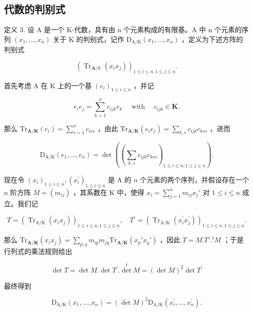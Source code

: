 \subsection{代数的判别式}

定义 3. 设 A 是一个 K-代数，具有由 n 个元素构成的有限基。A 中 n 个元素的序列 \((x_{1},\ldots,x_{n})\) 关于 K 的判别式，记作 \(\mathrm{D}_{\mathrm{A}/\mathrm{K}}(x_{1},\ldots,x_{n})\) ，定义为下述方阵的判别式

\[
\left(\operatorname{Tr} _ {\mathbf {A} / \mathbb {K}} \left(x _ {i} x _ {j}\right)\right) _ {1 \leqslant i \leqslant n, 1 \leqslant j \leqslant n}.
\]

首先考虑 A 在 K 上的一个基 \((e_i)_{1\leqslant i\leqslant n}\) ，并记

\[
e _ {i} e _ {j} = \sum_ {k = 1} ^ {n} c _ {i j k} e _ {k} \quad \text { with } \quad c _ {i j k} \in \mathbf {K}.\tag{30}
\]

那么 \(\mathrm{Tr}_{\mathbf{A} / \mathbf{K}}(e_i) = \sum_{s=1}^{n} c_{iss}\) ，由此 \(\mathrm{Tr}_{\mathbf{A} / \mathbf{K}}(e_i e_j) = \sum_{k,s} c_{ijk} c_{kss}\) ，进而

\[
\mathrm{D} _ {\mathrm{A} / \mathrm{K}} (e _ {1}, \dots , e _ {n}) = \det \left(\left(\sum_ {k, s} c _ {i j k} c _ {k s s}\right) _ {1 \leqslant i \leqslant n, 1 \leqslant j \leqslant n}\right).\tag{31}
\]

现在令 \((x_{i})_{1\leqslant i\leqslant n},(x_{i}^{\prime})_{1\leqslant i\leqslant n}\) 是 A 的 \(n\) 个元素的两个序列，并假设存在一个 \(n\) 阶方阵 \(M = (m_{ij})\) ，其系数在 K 中，使得 \(x_{i} = \sum_{j=1}^{n} m_{ij} x_{j}'\) 对 \(1 \leqslant i \leqslant n\) 成立。我们记

\[
T = \left(\operatorname{Tr} _ {\mathrm{A} / \mathrm{K}} \left(x _ {i} x _ {j}\right)\right) _ {1 \leqslant i \leqslant n, 1 \leqslant j \leqslant n}, \quad T ^ {\prime} = \left(\operatorname{Tr} _ {\mathrm{A} / \mathrm{K}} \left(x _ {i} ^ {\prime} x _ {j} ^ {\prime}\right)\right) _ {1 \leqslant i \leqslant n, 1 \leqslant j \leqslant n}.
\]

那么 \(\mathrm{Tr}_{\mathbf{A} / \mathbf{K}}(x_i x_j) = \sum_{p,q} m_{ip} m_{jq} \mathrm{Tr}_{\mathbf{A} / \mathbf{K}}(x_p' x_q')\) ，因此 \(T = M. T'.^t M\) ；于是行列式的乘法规则给出

\[
\det T = \det M. \det T ^ {\prime}. \det ^ {t} M = (\det M) ^ {2} \det T ^ {\prime}
\]

最终得到

\[
\mathrm{D} _ {\mathrm{A} / \mathrm{K}} (x _ {1}, \dots , x _ {n}) = (\det M) ^ {2} \mathrm{D} _ {\mathrm{A} / \mathrm{K}} (x _ {i} ^ {\prime}, \dots , x _ {n} ^ {\prime}).\tag{32}
\]

